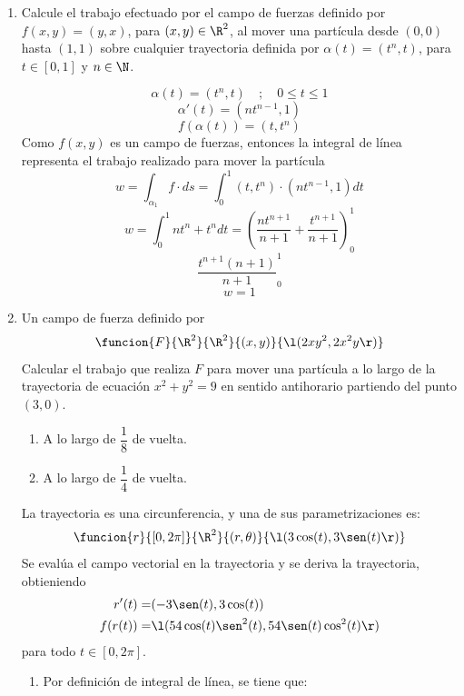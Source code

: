 \documentclass[a4,11pt]{aleph-examen}
\begin{document}
\begin{preguntas}
\begin{respuesta}
\begin{respuesta}
\begin{respuesta}
\begin{enumerate}
\item
    Calcule el trabajo efectuado por el campo de fuerzas definido por $f(x,y)=(y,x)$, para $(x,y)\in\R^2$, al mover una partícula desde $(0,0)$ hasta $(1,1)$ sobre cualquier trayectoria definida por $\alpha(t)=(t^n,t)$, para $t\in [0,1]$ y $n\in\N$.	
    
\begin{respuesta} 
    \[
        \alpha(t)=(t^n,t)\quad ;\quad 0\leq t \leq 1
    \]
    \[
        \alpha'(t)=(nt^{n-1},1)
    \]
    \[
        f(\alpha(t))=(t,t^n)
    \]
    Como $f(x,y)$ es un campo de fuerzas, entonces la integral de línea representa el trabajo realizado para mover la partícula
    \[
        w=\int_{\alpha_1}f\cdot ds=\int_0^1(t,t^n)\cdot(nt^{n-1},1)dt
    \]
    \[
        w=\int_0^1 nt^n+t^ndt=\left(\frac{nt^{n+1}}{n+1}+\frac{t^{n+1}}{n+1}\right)_0^1
    \]
    \[
        \frac{t^{n+1}{(n+1)}}{{n+1}}_0^1
    \]
    \[
        w=1
    \]
\end{respuesta}
\item Un campo de fuerza definido por
    \[
    \funcion{F}{\R^2}{\R^2}{(x,y)}{\l(2xy^2,2x^2y\r)}
    \]
Calcular el trabajo que realiza $F$ para mover una partícula a lo largo de la trayectoria de ecuación $x^2+y^2=9$ en sentido antihorario partiendo del punto $(3,0).$
\begin{enumerate}
    \item A lo largo de $\dfrac{1}{8}$ de vuelta.
    \item A lo largo de $\dfrac{1}{4}$ de vuelta.
\end{enumerate}
\begin{respuesta}
    La trayectoria es una circunferencia, y una de sus parametrizaciones es:
    \[
    \funcion{r}{[0,2\pi]}{\R^2}{(r,\theta)}{\l(3\cos (t), 3\sen (t)\r)}
    \]
    Se evalúa el campo vectorial en la trayectoria y se deriva la trayectoria, obtieniendo
    \begin{align*}
        r'(t)=&(-3 \sen(t),3 \cos(t))\\
        f(r(t))=&\l(54 \cos(t) \sen^2(t),54 \sen(t) \cos^2(t)\r)
    \end{align*}
    para todo $t\in[0,2 \pi ]$.
    \begin{enumerate}
        \item Por definición de integral de línea, se tiene que:

\end{enumerate}
\end{respuesta}
\end{enumerate}
\end{respuesta}
\end{respuesta}
\end{respuesta}
\end{preguntas}
\end{document}
